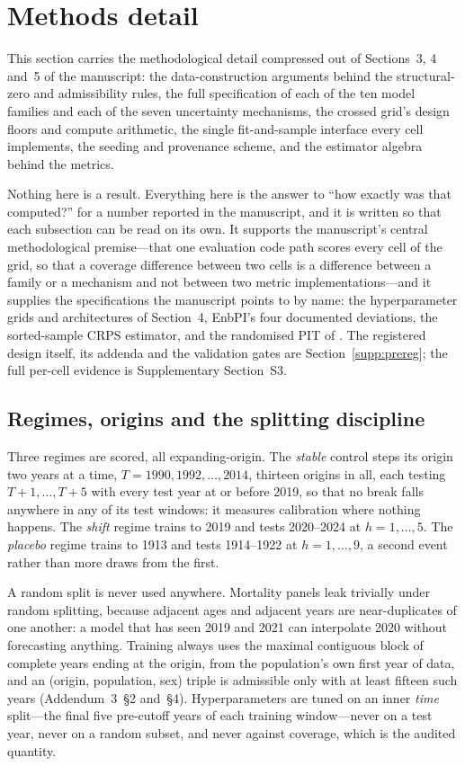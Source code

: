 \section{Methods detail}
\label{supp:methods}

This section carries the methodological detail compressed out of Sections~3,
4 and~5 of the manuscript: the data-construction arguments behind the
structural-zero and admissibility rules, the full specification of each of the
ten model families and each of the seven uncertainty mechanisms, the crossed
grid's design floors and compute arithmetic, the single fit-and-sample
interface every cell implements, the seeding and provenance scheme, and the
estimator algebra behind the metrics.

Nothing here is a result. Everything here is the answer to ``how exactly was
that computed?'' for a number reported in the manuscript, and it is written so
that each subsection can be read on its own. It supports the manuscript's
central methodological premise---that one evaluation code path scores every
cell of the grid, so that a coverage difference between two cells is a
difference between a family or a mechanism and not between two metric
implementations---and it supplies the specifications the manuscript points to
by name: the hyperparameter grids and architectures of
Section~4, EnbPI's four documented deviations, the sorted-sample CRPS
estimator, and the randomised PIT of \citet{czado2009predictive}. The
registered design itself, its addenda and the validation gates are
Section~\ref{supp:prereg}; the full per-cell evidence is Supplementary
Section~S3.

\subsection{Regimes, origins and the splitting discipline}
\label{supp:methods-regimes}

Three regimes are scored, all expanding-origin. The \emph{stable} control
steps its origin two years at a time, $T=1990,1992,\dots,2014$, thirteen
origins in all, each testing $T+1,\dots,T+5$ with every test year at or before
2019, so that no break falls anywhere in any of its test windows: it measures
calibration where nothing happens. The \emph{shift} regime trains to 2019 and
tests 2020--2024 at $h=1,\dots,5$. The \emph{placebo} regime trains to 1913
and tests 1914--1922 at $h=1,\dots,9$, a second event rather than more draws
from the first.

A random split is never used anywhere. Mortality panels leak trivially under
random splitting, because adjacent ages and adjacent years are near-duplicates
of one another: a model that has seen 2019 and 2021 can interpolate 2020
without forecasting anything. Training always uses the maximal contiguous
block of complete years ending at the origin, from the population's own first
year of data, and an (origin, population, sex) triple is admissible only with
at least fifteen such years (Addendum~3~\S2 and~\S4). Hyperparameters are
tuned on an inner \emph{time} split---the final five pre-cutoff years of each
training window---never on a test year, never on a random subset, and never
against coverage, which is the audited quantity.

